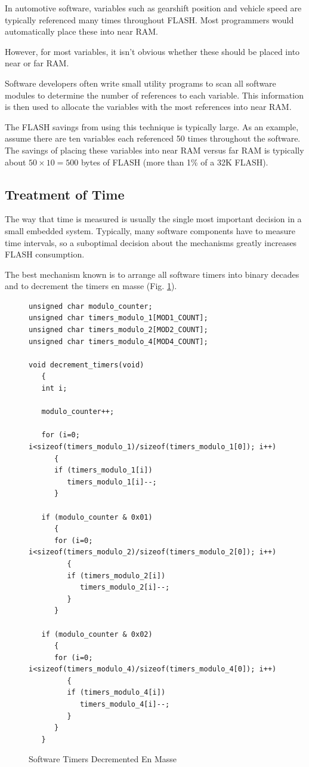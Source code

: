 \documentclass[letterpaper,10pt,titlepage]{article}
\begin{document}
In automotive software, variables such as gearshift position and vehicle speed
are typically referenced many times throughout FLASH.  Most programmers
would automatically place these into near RAM.

However, for most variables, it isn't obvious whether these should be placed
into near or far RAM.

Software developers often write small utility programs to scan all software
modules to determine the number of references to each variable.  This information
is then used to allocate the variables with the most references into near RAM.

The FLASH savings from using this technique is typically large.  As an example,
assume there are ten variables each referenced 50 times throughout the software.
The savings of placing these variables into near RAM versus far RAM is
typically about $50 \times 10 = 500$ bytes of FLASH (more than 1\% of a
32K FLASH).



\subsection{Treatment of Time}
\label{sfrr0:stot0}

The way that time is measured is usually the single most important decision
in a small embedded system.  Typically, many software components have to 
measure time intervals, so a suboptimal decision about the mechanisms
greatly increases FLASH consumption.

The best mechanism known is to arrange all software timers into
binary decades and to decrement the timers en masse
(Fig. \ref{fig:sfrr0:stot0:00}).

\begin{figure}
\begin{small}
\begin{verbatim}
unsigned char modulo_counter;
unsigned char timers_modulo_1[MOD1_COUNT];
unsigned char timers_modulo_2[MOD2_COUNT];
unsigned char timers_modulo_4[MOD4_COUNT];

void decrement_timers(void)
   {
   int i;

   modulo_counter++;

   for (i=0; i<sizeof(timers_modulo_1)/sizeof(timers_modulo_1[0]); i++)
      {
      if (timers_modulo_1[i])
         timers_modulo_1[i]--;
      }

   if (modulo_counter & 0x01)
      {
      for (i=0; i<sizeof(timers_modulo_2)/sizeof(timers_modulo_2[0]); i++)
         {
         if (timers_modulo_2[i])
            timers_modulo_2[i]--;
         }
      }

   if (modulo_counter & 0x02)
      {
      for (i=0; i<sizeof(timers_modulo_4)/sizeof(timers_modulo_4[0]); i++)
         {
         if (timers_modulo_4[i])
            timers_modulo_4[i]--;
         }
      }
   }
\end{verbatim}
\end{small}
\caption{Software Timers Decremented En Masse}
\label{fig:sfrr0:stot0:00}
\end{figure}
\end{document}
